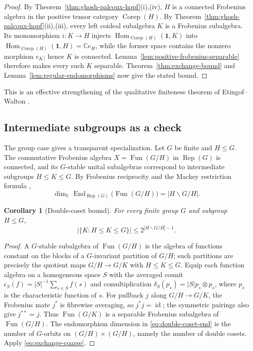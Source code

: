 \documentclass[11pt]{amsart}
\newtheorem{corollary}[theorem]{Corollary}
\theoremstyle{definition}
\theoremstyle{remark}
\newcommand{\one}{\mathbf 1}
\newcommand{\CC}{\mathbb C}
\DeclareMathOperator{\Hom}{Hom}
\DeclareMathOperator{\End}{End}
\DeclareMathOperator{\Corep}{Corep}
\DeclareMathOperator{\Rep}{Rep}
\DeclareMathOperator{\id}{id}
\begin{document}
\begin{proof}
By Theorem~\ref{thm:ghosh-palcoux-hopf}\textup{(i),(iv)}, $H$ is a
connected Frobenius algebra in the positive tensor category $\Corep(H)$.
By Theorem~\ref{thm:ghosh-palcoux-hopf}\textup{(ii),(iii)}, every left
coideal subalgebra $K$ is a Frobenius subalgebra.  Its monomorphism
$i:K\to H$ injects $\Hom_{\Corep(H)}(\one,K)$ into
$\Hom_{\Corep(H)}(\one,H)=\CC e_H$, while the former space contains the
nonzero morphism $e_K$; hence $K$ is connected.  Lemma~\ref{lem:positive-frobenius-separable}
therefore makes every such $K$ separable.  Theorem~\ref{thm:exchange-bound}
and Lemma~\ref{lem:regular-endomorphisms} now give the stated bound.
\end{proof}

This is an effective strengthening of the qualitative finiteness theorem of
Etingof--Walton \cite[Theorem~3.6]{EtingofWalton}.

\subsection{Intermediate subgroups as a check}

The group case gives a transparent specialization.  Let $G$ be finite and
$H\leq G$.  The commutative Frobenius algebra
$X=\operatorname{Fun}(G/H)$ in $\Rep(G)$ is connected, and its
$G$-stable unital subalgebras correspond to intermediate subgroups
$H\leq K\leq G$.  By Frobenius reciprocity and the Mackey restriction
formula \cite[\S\S7.2--7.3]{SerreLinearRepresentations},
\begin{equation}\label{eq:double-coset-end}
 \dim_{\CC}\End_{\Rep(G)}\bigl(\operatorname{Fun}(G/H)\bigr)
 =|H\backslash G/H|.
\end{equation}

\begin{corollary}[Double-coset bound]\label{cor:double-coset}
For every finite group $G$ and subgroup $H\leq G$,
\begin{equation}\label{eq:double-coset-bound}
 \bigl|\{K:H\leq K\leq G\}\bigr|
 \leq 2^{|H\backslash G/H|-1}.
\end{equation}
\end{corollary}

\begin{proof}
A $G$-stable subalgebra of $\operatorname{Fun}(G/H)$ is the algebra of
functions constant on the blocks of a $G$-invariant partition of $G/H$;
such partitions are precisely the quotient maps $G/H\to G/K$ with
$H\leq K\leq G$.  Equip each function algebra on a homogeneous space
$S$ with the averaged counit
$\epsilon_S(f)=|S|^{-1}\sum_{s\in S}f(s)$ and comultiplication
$\delta_S(p_s)=|S|p_s\otimes p_s$, where $p_s$ is the characteristic
function of $s$.  For pullback $j$ along $G/H\to G/K$, the Frobenius mate
$j^*$ is fibrewise averaging, so $j^*j=\id$; the symmetric pairings also
give $j^{**}=j$.  Thus $\operatorname{Fun}(G/K)$ is a separable Frobenius
subalgebra of $\operatorname{Fun}(G/H)$.  The endomorphism dimension in
\eqref{eq:double-coset-end} is the number of $G$-orbits on
$(G/H)\times(G/H)$, namely the number of double cosets.  Apply
\eqref{eq:exchange-coarse}.
\end{proof}
\end{document}
